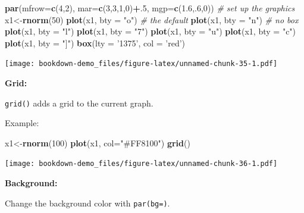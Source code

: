 \documentclass[]{book}
\newenvironment{Shaded}{\begin{snugshade}}{\end{snugshade}}
\newcommand{\KeywordTok}[1]{\textcolor[rgb]{0.13,0.29,0.53}{\textbf{#1}}}
\newcommand{\DataTypeTok}[1]{\textcolor[rgb]{0.13,0.29,0.53}{#1}}
\newcommand{\DecValTok}[1]{\textcolor[rgb]{0.00,0.00,0.81}{#1}}
\newcommand{\FloatTok}[1]{\textcolor[rgb]{0.00,0.00,0.81}{#1}}
\newcommand{\StringTok}[1]{\textcolor[rgb]{0.31,0.60,0.02}{#1}}
\newcommand{\CommentTok}[1]{\textcolor[rgb]{0.56,0.35,0.01}{\textit{#1}}}
\newcommand{\OperatorTok}[1]{\textcolor[rgb]{0.81,0.36,0.00}{\textbf{#1}}}
\newcommand{\NormalTok}[1]{#1}
\begin{document}
\begin{Shaded}
\begin{Highlighting}[]
\KeywordTok{par}\NormalTok{(}\DataTypeTok{mfrow=}\KeywordTok{c}\NormalTok{(}\DecValTok{4}\NormalTok{,}\DecValTok{2}\NormalTok{), }\DataTypeTok{mar=}\KeywordTok{c}\NormalTok{(}\DecValTok{3}\NormalTok{,}\DecValTok{3}\NormalTok{,}\DecValTok{1}\NormalTok{,}\DecValTok{0}\NormalTok{)}\OperatorTok{+}\NormalTok{.}\DecValTok{5}\NormalTok{, }\DataTypeTok{mgp=}\KeywordTok{c}\NormalTok{(}\FloatTok{1.6}\NormalTok{,.}\DecValTok{6}\NormalTok{,}\DecValTok{0}\NormalTok{))  }\CommentTok{# set up the graphics}
\NormalTok{x1<-}\KeywordTok{rnorm}\NormalTok{(}\DecValTok{50}\NormalTok{)}
\KeywordTok{plot}\NormalTok{(x1, }\DataTypeTok{bty =} \StringTok{"o"}\NormalTok{) }\CommentTok{# the default}
\KeywordTok{plot}\NormalTok{(x1, }\DataTypeTok{bty =} \StringTok{"n"}\NormalTok{) }\CommentTok{# no box}
\KeywordTok{plot}\NormalTok{(x1, }\DataTypeTok{bty =} \StringTok{"l"}\NormalTok{)}
\KeywordTok{plot}\NormalTok{(x1, }\DataTypeTok{bty =} \StringTok{"7"}\NormalTok{)}
\KeywordTok{plot}\NormalTok{(x1, }\DataTypeTok{bty =} \StringTok{"u"}\NormalTok{)}
\KeywordTok{plot}\NormalTok{(x1, }\DataTypeTok{bty =} \StringTok{"c"}\NormalTok{)}
\KeywordTok{plot}\NormalTok{(x1, }\DataTypeTok{bty =} \StringTok{"]"}\NormalTok{)}
\KeywordTok{box}\NormalTok{(}\DataTypeTok{lty =} \StringTok{'1375'}\NormalTok{, }\DataTypeTok{col =} \StringTok{'red'}\NormalTok{)}
\end{Highlighting}
\end{Shaded}

\texttt{[image: bookdown-demo\_files/figure-latex/unnamed-chunk-35-1.pdf]}

\textbf{Grid: }

\texttt{grid()} adds a grid to the current graph.

Example:

\begin{Shaded}
\begin{Highlighting}[]
\NormalTok{x1<-}\KeywordTok{rnorm}\NormalTok{(}\DecValTok{100}\NormalTok{)}
\KeywordTok{plot}\NormalTok{(x1, }\DataTypeTok{col=}\StringTok{"#FF8100"}\NormalTok{)}
\KeywordTok{grid}\NormalTok{()}
\end{Highlighting}
\end{Shaded}

\texttt{[image: bookdown-demo\_files/figure-latex/unnamed-chunk-36-1.pdf]}

\textbf{Background: }

Change the background color with \texttt{par(bg=)}.
\end{document}

